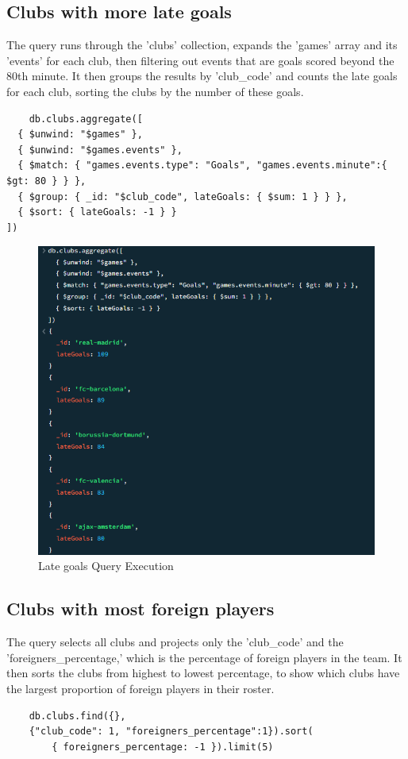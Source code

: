 \documentclass{Configuration_Files/PoliMi3i_thesis}
\begin{document}
\subsection{Clubs with more late goals}
The query runs through the 'clubs' collection, expands the 'games' array and its 'events' for each club, then filtering out events that are goals scored beyond the 80th minute. It then groups the results by 'club\_code' and counts the late goals for each club, sorting the clubs by the number of these goals.
\begin{verbatim}
    db.clubs.aggregate([
  { $unwind: "$games" },
  { $unwind: "$games.events" },
  { $match: { "games.events.type": "Goals", "games.events.minute":{ $gt: 80 } } },
  { $group: { _id: "$club_code", lateGoals: { $sum: 1 } } },
  { $sort: { lateGoals: -1 } }
])
\end{verbatim}
\begin{figure}[htbp]
    \centering
    \includegraphics[scale=0.9]{Images/Queries/Clubs/late_goals_per_club/lgpc.png}
    \caption{Late goals Query Execution}
\end{figure}
\subsection{Clubs with most foreign players}
The query selects all clubs and projects only the 'club\_code' and the 'foreigners\_percentage,' which is the percentage of foreign players in the team. It then sorts the clubs from highest to lowest percentage, to show which clubs have the largest proportion of foreign players in their roster.
\begin{verbatim}
    db.clubs.find({}, 
    {"club_code": 1, "foreigners_percentage":1}).sort(
        { foreigners_percentage: -1 }).limit(5)
\end{verbatim}
\end{document}
